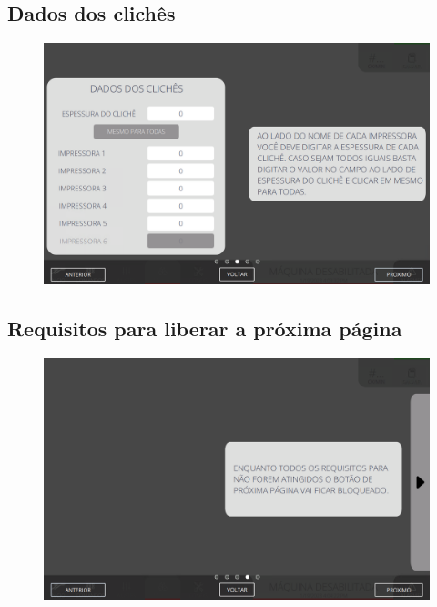\newpage
\thispagestyle{fancy}
\vspace*{40 pt}
\subsection{\small Dados dos clichês}
\vspace*{\fill}
\begin{figure}[h]
    \centering
    \includegraphics[width=576 px,height=360 px]{src/imagesICV/09-request/new/e-3.png}
\end{figure}
\vspace*{\fill}

\newpage
\thispagestyle{fancy}
\vspace*{40 pt}
\subsection{\small Requisitos para liberar a próxima página}
\vspace*{\fill}
\begin{figure}[h]
    \centering
    \includegraphics[width=576 px,height=360 px]{src/imagesICV/09-request/new/e-4-COM-ERRO-DIGITAÇÃO.png}
\end{figure}
\vspace*{\fill}

